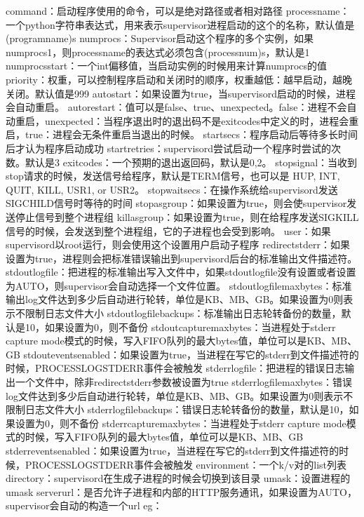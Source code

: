\documentclass[a4paper,10pt,english]{sphinxmanual}
\begin{document}
\begin{itemize}
\begin{sphinxVerbatim}[commandchars=\\\{\}]
command：启动程序使用的命令，可以是绝对路径或者相对路径
process\PYGZus{}name：一个python字符串表达式，用来表示supervisor进程启动的这个的名称，默认值是\PYGZpc{}(program\PYGZus{}name)s
numprocs：Supervisor启动这个程序的多个实例，如果numprocs\PYGZgt{}1，则process\PYGZus{}name的表达式必须包含\PYGZpc{}(process\PYGZus{}num)s，默认是1
numprocs\PYGZus{}start：一个int偏移值，当启动实例的时候用来计算numprocs的值
priority：权重，可以控制程序启动和关闭时的顺序，权重越低：越早启动，越晚关闭。默认值是999
autostart：如果设置为true，当supervisord启动的时候，进程会自动重启。
autorestart：值可以是false、true、unexpected。false：进程不会自动重启，unexpected：当程序退出时的退出码不是exitcodes中定义的时，进程会重启，true：进程会无条件重启当退出的时候。
startsecs：程序启动后等待多长时间后才认为程序启动成功
startretries：supervisord尝试启动一个程序时尝试的次数。默认是3
exitcodes：一个预期的退出返回码，默认是0,2。
stopsignal：当收到stop请求的时候，发送信号给程序，默认是TERM信号，也可以是 HUP, INT, QUIT, KILL, USR1, or USR2。
stopwaitsecs：在操作系统给supervisord发送SIGCHILD信号时等待的时间
stopasgroup：如果设置为true，则会使supervisor发送停止信号到整个进程组
killasgroup：如果设置为true，则在给程序发送SIGKILL信号的时候，会发送到整个进程组，它的子进程也会受到影响。
user：如果supervisord以root运行，则会使用这个设置用户启动子程序
redirect\PYGZus{}stderr：如果设置为true，进程则会把标准错误输出到supervisord后台的标准输出文件描述符。
stdout\PYGZus{}logfile：把进程的标准输出写入文件中，如果stdout\PYGZus{}logfile没有设置或者设置为AUTO，则supervisor会自动选择一个文件位置。
stdout\PYGZus{}logfile\PYGZus{}maxbytes：标准输出log文件达到多少后自动进行轮转，单位是KB、MB、GB。如果设置为0则表示不限制日志文件大小
stdout\PYGZus{}logfile\PYGZus{}backups：标准输出日志轮转备份的数量，默认是10，如果设置为0，则不备份
stdout\PYGZus{}capture\PYGZus{}maxbytes：当进程处于stderr capture mode模式的时候，写入FIFO队列的最大bytes值，单位可以是KB、MB、GB
stdout\PYGZus{}events\PYGZus{}enabled：如果设置为true，当进程在写它的stderr到文件描述符的时候，PROCESS\PYGZus{}LOG\PYGZus{}STDERR事件会被触发
stderr\PYGZus{}logfile：把进程的错误日志输出一个文件中，除非redirect\PYGZus{}stderr参数被设置为true
stderr\PYGZus{}logfile\PYGZus{}maxbytes：错误log文件达到多少后自动进行轮转，单位是KB、MB、GB。如果设置为0则表示不限制日志文件大小
stderr\PYGZus{}logfile\PYGZus{}backups：错误日志轮转备份的数量，默认是10，如果设置为0，则不备份
stderr\PYGZus{}capture\PYGZus{}maxbytes：当进程处于stderr capture mode模式的时候，写入FIFO队列的最大bytes值，单位可以是KB、MB、GB
stderr\PYGZus{}events\PYGZus{}enabled：如果设置为true，当进程在写它的stderr到文件描述符的时候，PROCESS\PYGZus{}LOG\PYGZus{}STDERR事件会被触发
environment：一个k/v对的list列表
directory：supervisord在生成子进程的时候会切换到该目录
umask：设置进程的umask
serverurl：是否允许子进程和内部的HTTP服务通讯，如果设置为AUTO，supervisor会自动的构造一个url
eg：



\end{sphinxVerbatim}
\end{itemize}
\end{document}
